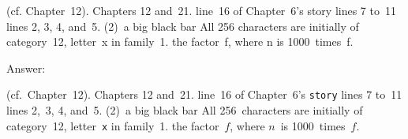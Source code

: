 (cf. Chapter~12).
Chapters 12 and~21.
line~16 of Chapter~6's story
lines 7 to~11
lines 2, 3, 4, and~5.
(2)~a big black bar
All 256 characters are initially of category~12,
letter~x in family~1.
the factor~f, where n is 1000~times~f.

Answer:

(cf.~Chapter~12).
Chapters 12 and~21.
line~16 of Chapter~6’s {\tt story}
lines 7 to~11
lines 2,~3, 4, and~5.
(2)~a big black bar
All 256~characters are initially of category~12,
letter~{\tt x} in family~1.
the factor~$f$, where $n$~is 1000~times~$f$.

\bye
